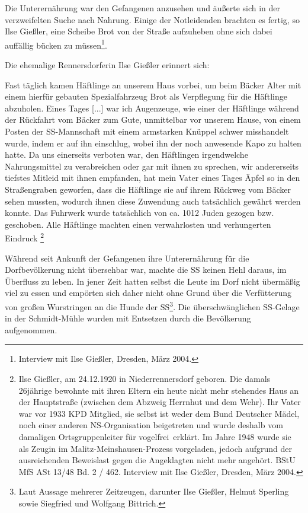 Die Unterernährung war den Gefangenen anzusehen und äußerte sich in der verzweifelten Suche nach Nahrung. Einige der Notleidenden brachten es fertig, so Ilse Gießler, eine Scheibe Brot von der Straße aufzuheben ohne sich dabei auffällig bücken zu müssen\footnote{Interview mit Ilse Gießler, Dresden, März 2004.}. 

Die ehemalige Rennersdorferin Ilse Gießler erinnert sich:
\begin{leftbar} 
Fast täglich kamen Häftlinge an unserem Haus vorbei, um beim Bäcker Alter mit einem hierfür gebauten Spezialfahrzeug Brot als Verpflegung für die Häftlinge abzuholen. Eines Tages {[}...{]} war ich Augenzeuge, wie einer der Häftlinge während der Rückfahrt vom Bäcker zum Gute, unmittelbar vor unserem Hause, von einem Posten der SS-Mannschaft mit einem armstarken Knüppel schwer misshandelt wurde, indem er auf ihn einschlug, wobei ihn der noch anwesende Kapo zu halten hatte. Da uns einerseits verboten war, den Häftlingen irgendwelche Nahrungsmittel zu verabreichen oder gar mit ihnen zu sprechen, wir andererseits tiefstes Mitleid mit ihnen empfanden, hat mein Vater eines Tages Äpfel so in den Straßengraben geworfen, dass die Häftlinge sie auf ihrem Rückweg vom Bäcker sehen mussten, wodurch ihnen diese Zuwendung auch tatsächlich gewährt werden konnte. Das Fuhrwerk wurde tatsächlich von ca. 10\textendash{}12 Juden gezogen bzw. geschoben. Alle Häftlinge machten einen verwahrlosten und verhungerten Eindruck
\footnote{Ilse Gießler, am 24.12.1920 in Niederrennersdorf geboren. Die damals 26jährige bewohnte mit ihren Eltern ein heute nicht mehr stehendes Haus an der Hauptstraße (zwischen dem Abzweig Herrnhut und dem Wehr). Ihr Vater war vor 1933 KPD Mitglied, sie selbst ist weder dem Bund Deutscher Mädel, noch einer anderen NS-Organisation beigetreten und wurde deshalb vom damaligen Ortsgruppenleiter für \glqq vogelfrei\grqq~erklärt. Im Jahre 1948 wurde sie als Zeugin im Malitz-Meinshausen-Prozess vorgeladen, jedoch aufgrund der ausreichenden Beweislast gegen die Angeklagten nicht mehr angehört. BStU MfS ASt 13/48 Bd. 2 / 462. Interview mit Ilse Gießler, Dresden, März 2004.} 
\end{leftbar}


Während seit Ankunft der Gefangenen ihre Unterernährung für die Dorfbevölkerung nicht übersehbar war, machte die SS keinen Hehl daraus, im Überfluss zu leben. In jener Zeit hatten selbst die Leute im Dorf nicht übermäßig viel zu essen und empörten sich daher nicht ohne Grund über die Verfütterung von großen Wurstringen an die Hunde der SS\footnote{Laut Aussage mehrerer Zeitzeugen, darunter Ilse Gießler, Helmut Sperling sowie Siegfried und Wolfgang Bittrich.}. Die überschwänglichen SS-Gelage in der Schmidt-Mühle wurden mit Entsetzen durch die Bevölkerung aufgenommen.


